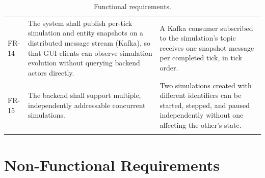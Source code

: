\documentclass{scrreprt}
\begin{document}
\begin{longtable}{@{}p{1.5cm} p{6.3cm} p{6.3cm}@{}}
  FR-14 &
  The system shall publish per-tick simulation and entity snapshots on a
  distributed message stream (Kafka), so that GUI clients can observe
  simulation evolution without querying backend actors directly. &
  A Kafka consumer subscribed to the simulation's topic receives one
  snapshot
  message per completed tick, in tick order. \\

  FR-15 &
  The backend shall support multiple, independently addressable concurrent
  simulations. &
  Two simulations created with different identifiers can be started,
  stepped,
  and paused independently without one affecting the other's state. \\

  \caption{Functional requirements.}
  \label{tab:functional-requirements}
  \end{longtable}

  \section{Non-Functional Requirements}
  \label{sec:non-functional-requirements}
\end{document}
